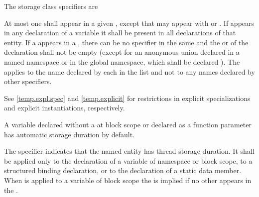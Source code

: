 \pnum
The storage class specifiers are
\begin{bnf}
\br
    \br
    \br
    \br
\end{bnf}

At most one  shall appear in a given
, except that  may appear with  or
. If  appears in any declaration of
a variable it shall be present in all declarations of that entity. If a
appears in a , there can be no
 specifier in the same  and
the  or 
of the declaration shall not be
empty (except for an anonymous union declared in a named namespace or in the
global namespace, which shall be declared
%
). The
 applies to the name declared by each
 in the list and not to any names declared by
other specifiers.
\begin{note}
See \ref{temp.expl.spec} and \ref{temp.explicit} for restrictions
in explicit specializations and explicit instantiations, respectively.
\end{note}

\pnum
\begin{note}
A variable declared without a 
at block scope or declared as a function parameter
has automatic storage duration by default.
\end{note}

\pnum
The  specifier
indicates that the named entity has thread storage duration. It
shall be applied only
to the declaration of a variable of namespace or block scope,
to a structured binding declaration, or
to the declaration of a static data member.
When  is applied to a variable of block scope the
  is implied if no other
 appears in the
.

